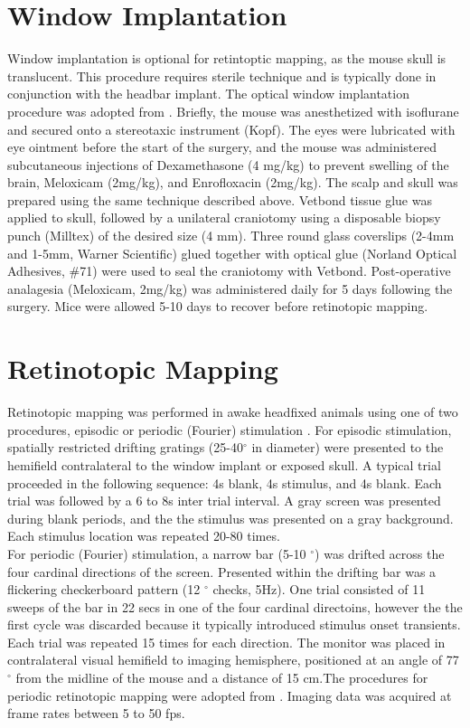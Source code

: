 \section{Window Implantation} 
Window implantation is optional for retintoptic mapping, as the mouse skull is translucent. This procedure requires sterile technique and is typically done in conjunction with the headbar implant. The optical window implantation procedure was adopted from \textcite{Goldey2014}. Briefly, the mouse was anesthetized with isoflurane and secured onto a stereotaxic instrument (Kopf). The eyes were lubricated with eye ointment before the start of the surgery, and the mouse was administered subcutaneous injections of Dexamethasone (4 mg/kg) to prevent swelling of the brain, Meloxicam (2mg/kg), and Enrofloxacin (2mg/kg). The scalp and skull was prepared using the same technique described above. Vetbond tissue glue was applied to skull, followed by a unilateral craniotomy using a disposable biopsy punch (Milltex) of the desired size (4 mm). Three round glass coverslips (2-4mm and 1-5mm, Warner Scientific) glued together with optical glue (Norland Optical Adhesives, \#71) were used to seal the craniotomy with Vetbond. Post-operative analagesia (Meloxicam, 2mg/kg) was administered daily for 5 days following the surgery.  Mice were allowed 5-10 days to recover before retinotopic mapping.  

\section{Retinotopic Mapping}
Retinotopic mapping was performed in awake headfixed animals using one of two procedures, episodic \parencite{Gias2005,Andermann2011} or periodic (Fourier) stimulation \parencite{Kalatsky2003,Garrett2014,Juavinett2016}. For episodic stimulation, spatially restricted drifting gratings (25-40$^{\circ}$ in diameter) were presented to the hemifield contralateral to the window implant or exposed skull. A typical trial proceeded in the following sequence: 4s blank, 4s stimulus, and 4s blank. Each trial was followed by a 6 to 8s inter trial interval. A gray screen was presented during blank periods, and the the stimulus was presented on a gray background. Each stimulus location was repeated 20-80 times. \\
For periodic (Fourier) stimulation, a narrow bar (5-10 $^{\circ}$) was drifted across the four cardinal directions of the screen. Presented within the drifting bar was a flickering checkerboard pattern (12 $^{\circ}$ checks, 5Hz). One trial consisted of 11 sweeps of the bar in 22 secs in one of the four cardinal directoins, however the the first cycle was discarded because it typically introduced stimulus onset transients. Each trial was repeated 15 times for each direction. The monitor was placed in contralateral visual hemifield to imaging hemisphere, positioned at an angle of 77 $^{\circ}$ from the midline of the mouse and a distance of 15 cm.The procedures for periodic retinotopic mapping were adopted from \parencite{Juavinett2016}. Imaging data was acquired at frame rates between 5 to 50 fps. 

